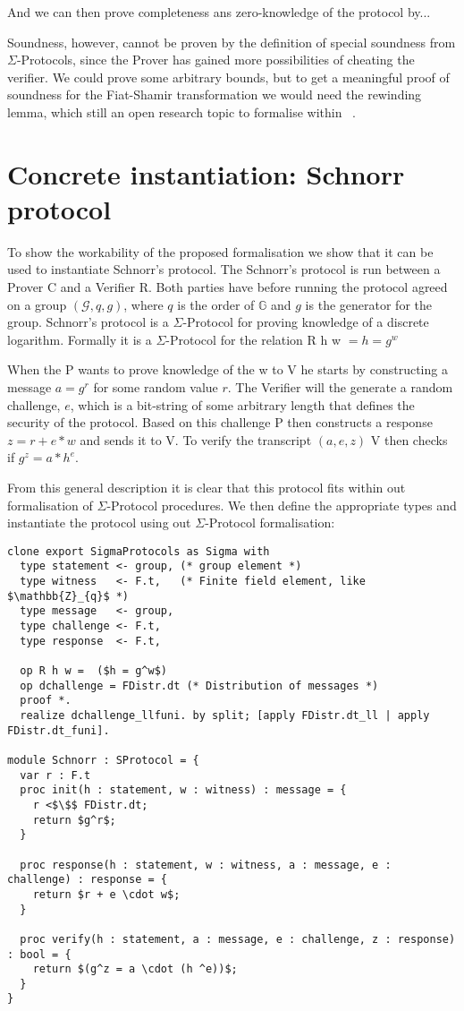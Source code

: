 And we can then prove completeness ans zero-knowledge of the protocol by...

Soundness, however, cannot be proven by the definition of special soundness from
$\Sigma$-Protocols, since the Prover has gained more possibilities of cheating
the verifier. We could prove some arbitrary bounds, but to get a meaningful
proof of soundness for the Fiat-Shamir transformation we would need the
rewinding lemma, which still an open research topic to formalise within \easycrypt\ \cite{ec_intro}.

\section{Concrete instantiation: Schnorr protocol}
\label{sec:schnorr}
To show the workability of the proposed formalisation we show that it can be
used to instantiate Schnorr's protocol.
The Schnorr's protocol is run between a Prover C and a
Verifier R. Both parties have before running the protocol agreed on a group
$(\mathcal{G}, q, g)$, where $q$ is the order of $\mathbb{G}$ and $g$ is the
generator for the group.
Schnorr's protocol is a $\Sigma$-Protocol for proving knowledge of a discrete
logarithm. Formally it is a $\Sigma$-Protocol for the relation R h w $= h = g^{w}$

When the P wants to prove knowledge of the w to V he starts by
constructing a message $a = g^{r}$ for some random value $r$. The Verifier will
the generate a random challenge, $e$, which is a bit-string of some arbitrary length
that defines the security of the protocol.
Based on this challenge P then constructs a response $z = r + e * w$ and sends
it to V.
To verify the transcript $(a,e,z)$ V then checks if $g^{z} = a * h^{e}$.

From this general description it is clear that this protocol fits within out
formalisation of $\Sigma$-Protocol procedures. We then define the appropriate
types and instantiate the protocol using out $\Sigma$-Protocol formalisation:

\begin{lstlisting}[mathescape,label=lst:sigma:schnorr,caption=Schnorr instantiation]
clone export SigmaProtocols as Sigma with
  type statement <- group, (* group element *)
  type witness   <- F.t,   (* Finite field element, like $\mathbb{Z}_{q}$ *)
  type message   <- group,
  type challenge <- F.t,
  type response  <- F.t,

  op R h w =  ($h = g^w$)
  op dchallenge = FDistr.dt (* Distribution of messages *)
  proof *.
  realize dchallenge_llfuni. by split; [apply FDistr.dt_ll | apply FDistr.dt_funi].

module Schnorr : SProtocol = {
  var r : F.t
  proc init(h : statement, w : witness) : message = {
    r <$\$$ FDistr.dt;
    return $g^r$;
  }

  proc response(h : statement, w : witness, a : message, e : challenge) : response = {
    return $r + e \cdot w$;
  }

  proc verify(h : statement, a : message, e : challenge, z : response) : bool = {
    return $(g^z = a \cdot (h ^e))$;
  }
}
\end{lstlisting}

